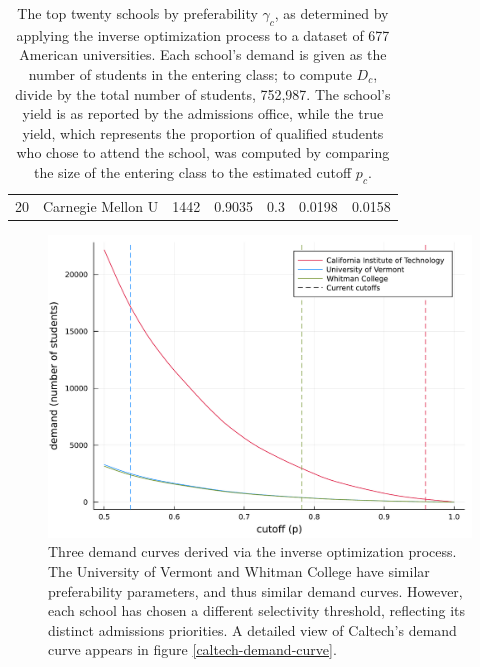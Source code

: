 \documentclass[12pt]{article}
\theoremstyle{definition}
\begin{document}
\begin{table}[]
\begin{tabular}{r|l|r|l|l|l|l}
20                                 & Carnegie Mellon U                     & 1442                                 & 0.9035                  & 0.3            & 0.0198              & 0.0158                             
\end{tabular}
\caption{\label{tab:US-inverse-optimization}
The top twenty schools by preferability $\gamma_c$, as determined by applying the inverse optimization process to a dataset of 677 American universities. Each school's demand is given as the number of students in the entering class; to compute $D_c$, divide by the total number of students, 752,987. The school's yield is as reported by the admissions office, while the true yield, which represents the proportion of qualified students who chose to attend the school, was computed by comparing the size of the entering class to the estimated cutoff $p_c$.}
\end{table}





\begin{figure}
\begin{center}\includegraphics[width=\linewidth, ]{plots/three-demand-curves.pdf}\end{center}
\captionsetup{singlelinecheck=off}
    \caption[.]{Three demand curves derived via the inverse optimization process. The University of Vermont and Whitman College have similar preferability parameters, and thus similar demand curves. However, each school has chosen a different selectivity threshold, reflecting its distinct admissions priorities. A detailed view of Caltech's demand curve appears in figure \ref{caltech-demand-curve}.}
\label{three-demand-curves}
\end{figure}
\end{document}
